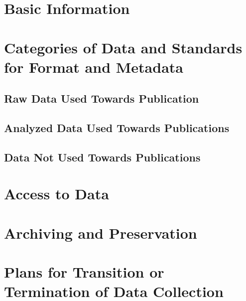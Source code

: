 \section{Basic Information}
\section{Categories of Data and Standards for Format and Metadata}
\subsection{Raw Data Used Towards Publication}
\subsection{Analyzed Data Used Towards Publications}
\subsection{Data Not Used Towards Publications}
\section{Access to Data}
\section{Archiving and Preservation}
\section{Plans for Transition or Termination of Data Collection}
